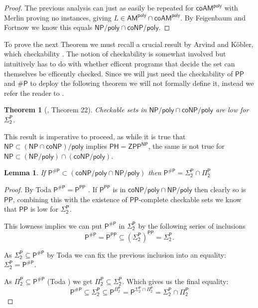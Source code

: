 \documentclass{article}
\newtheorem*{theorem*}{Theorem}
\newtheorem{lemma}[theorem]{Lemma}
\begin{document}
\begin{proof}
    The previous analysis can just as easily be repeated for $\mathsf{coAM^{poly}}$ with Merlin proving no instances, giving $L\in \mathsf{AM^{poly} \cap coAM^{poly}}$. By Feigenbaum and Fortnow we know this equals $\mathsf{NP/poly \cap coNP/poly}$.
\end{proof}

To prove the next Theorem we must recall a crucial result by Arvind and Köbler, which checkability \cite{ARVIND2002257,zoo}. The notion of checkability is somewhat involved but intuitively has to do with whether efficent programs that decide the set can themselves be efficently checked. Since we will just need the checkability of $\mathsf{PP}$ and $\mathsf{\# P}$ to deploy the following theorem we will not formally define it, instead we refer the reader to \cite{ARVIND2002257, blum1995designing}.

\begin{theorem*}[\cite{ARVIND2002257}, Theorem 22]
    Checkable sets in $\mathsf{NP/poly \cap coNP/poly}$ are low for $\mathsf{\Sigma_2^P}$.
\end{theorem*}

This result is imperative to proceed, as while it is true that $\mathsf{NP\subset (NP\cap coNP)/poly}$ implies $\mathsf{PH=ZPP^{NP}}$, the same is not true for $\mathsf{NP\subset (NP/poly)\cap (coNP/poly)}$.

\begin{lemma}\label{lma: sharp P in conp/poly}
    If $\mathsf{P^{\# P}}\subset (\mathsf{coNP/poly \cap NP/poly})$ then $\mathsf{P^{\# P}=\Sigma_2^P\cap \Pi_2^P}$
\end{lemma}
\begin{proof}
By Toda $\mathsf{P^{\#P}=P^{PP}}$ \cite{toda1991pp}.    
    If $\mathsf{P^{PP}}$ is in $\mathsf{\mathsf{coNP/poly \cap NP/poly}}$ then clearly so is $\mathsf{PP}$, combining this with the existence of $\mathsf{PP}$-complete checkable sets \cite{ARVIND2002257} we know that $\mathsf{PP}$ is low for $\mathsf{\Sigma_2^P}$.

    This lowness implies we can put  $\mathsf{P^{\# P}}$ in $\mathsf{\Sigma_2^P}$ by the following series of inclusions
    \[
    \mathsf{
    P^{\#P}=P^{PP}\subseteq (\Sigma_2^P)^{PP} = \Sigma_2^P.
    }
    \]

    As $\mathsf{\Sigma_2^P\subseteq P^{\# P}}$ by Toda \cite{toda1991pp} we can fix the previous inclusion into an equality: $\mathsf{\Sigma_2^P =  P^{\# P}}$.

    As $\mathsf{\Pi_2^P \subseteq P^{\# P}}$ (Toda \cite{toda1991pp}) we get $\mathsf{\Pi_2^P\subseteq \Sigma_2^P}$.
    Which gives us the final equality:
    \[
    \mathsf{P^{\# P} \subseteq \Sigma_2^P \subseteq P^{\Pi_2^P}= P^{\Sigma_2^P\cap\Pi_2^P}=\Sigma_2^P\cap\Pi_2^P}
    \]
\end{proof}
\end{document}
